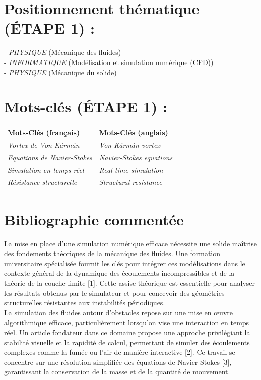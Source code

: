 \documentclass{article}
\begin{document}
\section*{Positionnement thématique (ÉTAPE 1) :}
- \textit{PHYSIQUE} (Mécanique des fluides)\\
- \textit{INFORMATIQUE} (Modélisation et simulation numérique (CFD))\\
- \textit{PHYSIQUE} (Mécanique du solide)\\


\section*{Mots-clés (ÉTAPE 1) :}
\begin{tabular}{ll}
\textbf{Mots-Clés (français)} & \textbf{Mots-Clés (anglais)} \\
\textit{Vortex de Von Kármán} & \textit{Von Kármán vortex} \\
\textit{Equations de Navier-Stokes} & \textit{Navier-Stokes equations} \\
\textit{Simulation en temps réel} & \textit{Real-time simulation} \\
\textit{Résistance structurelle} & \textit{Structural resistance} 
\end{tabular}
\vspace{5mm}  


\section*{Bibliographie commentée}

La mise en place d'une simulation numérique efficace nécessite une solide maîtrise des 
fondements théoriques de la mécanique des fluides. Une formation universitaire spécialisée 
fournit les clés pour intégrer ces modélisations dans le contexte général de la dynamique 
des écoulements incompressibles et de la théorie de la couche limite [1]. Cette assise 
théorique est essentielle pour analyser les résultats obtenus par le simulateur et pour 
concevoir des géométries structurelles résistantes aux instabilités périodiques.\\

La simulation des fluides autour d'obstacles repose sur une mise en œuvre algorithmique 
efficace, particulièrement lorsqu'on vise une interaction en temps réel. Un article fondateur 
dans ce domaine propose une approche privilégiant la stabilité visuelle et la rapidité de 
calcul, permettant de simuler des écoulements complexes comme la fumée ou l'air de manière 
interactive [2]. Ce travail se concentre sur une résolution simplifiée des équations de 
Navier-Stokes [3], garantissant la conservation de la masse et de la quantité de mouvement.\\
\end{document}
